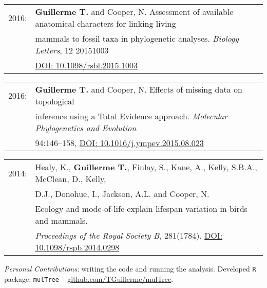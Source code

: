 \documentclass[10pt,a4paper]{article}
\begin{document}
{\bigskip

\begin{tabular}{ll}
2016: &\textbf{Guillerme T.} and Cooper, N. Assessment of available anatomical characters for linking living\\
& mammals to fossil taxa in phylogenetic analyses. \textit{Biology Letters}, 12 20151003\\
& \href{http://rsbl.royalsocietypublishing.org/content/12/5/20151003}{DOI: 10.1098/rsbl.2015.1003}\\ %
\end{tabular}

\bigskip

\begin{tabular}{ll}
2016: & \textbf{Guillerme T.} and Cooper, N. Effects of missing data on topological\\
& inference using a Total Evidence approach. \textit{Molecular Phylogenetics and Evolution}\\
&  94:146–158, \href{http://goo.gl/bVGrQJ}{DOI: 10.1016/j.ympev.2015.08.023}\\
\end{tabular}

\bigskip

\begin{tabular}{ll}
2014: & Healy, K., \textbf{Guillerme T.}, Finlay, S., Kane, A., Kelly, S.B.A., McClean, D., Kelly, \\
& D.J., Donohue, I., Jackson, A.L. and Cooper, N. \\
& Ecology and mode-of-life explain lifespan variation in birds and mammals.\\
& \textit{Proceedings of the Royal Society B}, 281(1784). \href{http://rspb.royalsocietypublishing.org/content/281/1784/20140298}{DOI: 10.1098/rspb.2014.0298}\\ %
\end{tabular}

\textit{Personal Contributions:} writing the code and running the analysis. Developed \texttt{R} package: \texttt{mulTree} -- \href{https://github.com/TGuillerme/mulTree}{github.com/TGuillerme/mulTree}.
\bigskip


}
\end{document}
